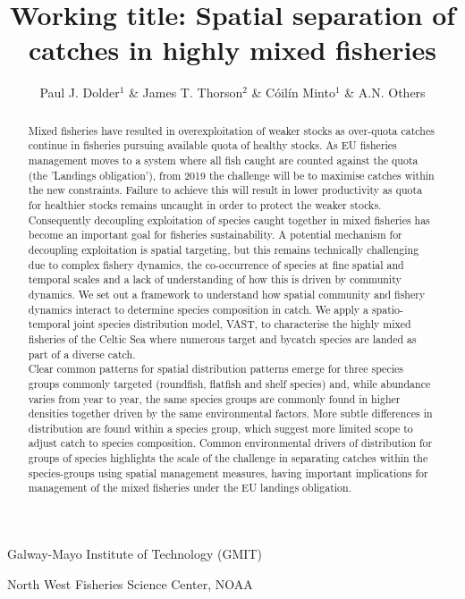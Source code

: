 \documentclass{nature}
\title{Working title: Spatial separation of catches in highly mixed fisheries}
\author{Paul J. Dolder$^1$ \& James T. Thorson$^2$ \& Cóilín Minto$^1$ \& A.N.
Others}
\begin{document}
\maketitle

\begin{affiliations}
\item Galway-Mayo Institute of Technology (GMIT) 
\item North West Fisheries Science Center, NOAA
\end{affiliations}

\begin{linenumbers}

\begin{abstract} 
Mixed fisheries have resulted in overexploitation of weaker stocks as
over-quota catches continue in fisheries pursuing available quota of healthy
stocks. As EU fisheries management moves to a system where all fish caught are
counted against the quota (the 'Landings obligation'), from 2019 the challenge
will be to maximise catches within the new constraints. Failure to achieve this
will result in lower productivity as quota for healthier stocks remains
uncaught in order to protect the weaker stocks. Consequently decoupling
exploitation of species caught together in mixed fisheries has become an
important goal for fisheries sustainability. A potential mechanism for
decoupling exploitation is spatial targeting, but this remains technically
challenging due to complex fishery dynamics, the co-occurrence of species at
fine spatial and temporal scales and a lack of understanding of how this is
driven by community dynamics.  We set out a framework to understand how spatial
community and fishery dynamics interact to determine species composition in
catch. We apply a spatio-temporal joint species distribution model, VAST, to
characterise the highly mixed fisheries of the Celtic Sea where numerous target
and bycatch species are landed as part of a diverse catch. \\

Clear common patterns for spatial distribution patterns emerge for three
species groups commonly targeted (roundfish, flatfish and shelf species) and,
while abundance varies from year to year, the same species groups are commonly
found in higher densities together driven by the same environmental factors.
More subtle differences in distribution are found within a species group, which
suggest more limited scope to adjust catch to species composition. Common
environmental drivers of distribution for groups of species highlights the
scale of the challenge in separating catches within the species-groups using
spatial management measures, having important implications for management of
the mixed fisheries under the EU landings obligation.


\end{abstract}
\end{linenumbers}
\end{document}
